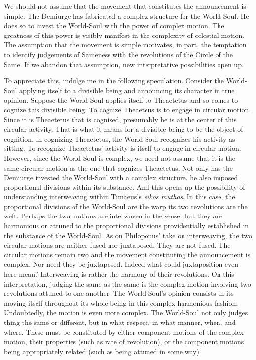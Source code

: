 We should not assume that the movement that constitutes the announcement is simple. The Demiurge has fabricated a complex structure for the World-Soul. He does so to invest the World-Soul with the power of complex motion. The greatness of this power is visibly manifest in the complexity of celestial motion. The assumption that the movement is simple motivates, in part, the temptation to identify judgements of Sameness with the revolutions of the Circle of the Same. If we abandon that assumption, new interpretative possibilities open up.

To appreciate this, indulge me in the following speculation. Consider the World-Soul applying itself to a divisible being and announcing its character in true opinion. Suppose the World-Soul applies itself to Theaetetus and so comes to cognize this divisible being. To cognize Theaeteus is to engage in circular motion. Since it is Theaetetus that is cognized, presumably he is at the center of this circular activity. That is what it means for a divisible being to be the object of cognition. In cognizing Theaetetus, the World-Soul recognizes his activity as sitting. To recognize Theaetetus' activity is itself to engage in circular motion. However, since the World-Soul is complex, we need not assume that it is the same circular motion as the one that cognizes Theaetetus. Not only has the Demiurge invested the World-Soul with a complex structure, he also imposed proportional divisions within its substance. And this opens up the possibility of understanding interweaving within Timaeus's \emph{eikos muthos}. In this case, the proportional divisions of the World-Soul are the warp its two revolutions are the weft. Perhaps the two motions are interwoven in the sense that they are harmonious or attuned to the proportional divisions providentially established in the substance of the World-Soul. As on Philoponus' take on interweaving, the two circular motions are neither fused nor juxtaposed. They are not fused. The circular motions remain two and the movement constituting the announcement is complex. Nor need they be juxtaposed. Indeed what could juxtaposition even here mean? Interweaving is rather the harmony of their revolutions. On this interpretation, judging the same as the same is the complex motion involving two revolutions attuned to one another. The World-Soul's opinion consists in its moving itself throughout its whole being in this complex harmonious fashion. Undoubtedly, the motion is even more complex. The World-Soul not only judges thing the same or different, but in what respect, in what manner, when, and where. These must be constituted by either component motions of the complex motion, their properties (such as rate of revolution), or the component motions being appropriately related (such as being attuned in some way).

